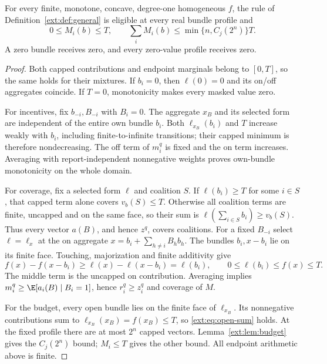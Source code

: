 \begin{theorem}\label{ext:thm:general}
For every finite, monotone, concave, degree-one homogeneous $f$, the rule of
Definition~\ref{ext:def:general} is eligible at every real bundle profile and
\[
 0\le M_i(b)\le T,\qquad
 \sum_iM_i(b)\le\min\{n,C_j(2^n)\}T.
\]
A zero bundle receives zero, and every zero-value profile receives zero.
\end{theorem}
\begin{proof}
Both capped contributions and endpoint marginals belong to $[0,T]$, so the
same holds for their mixtures.  If $b_i=0$, then $\ell(0)=0$ and its on/off
aggregates coincide.  If $T=0$, monotonicity makes every masked value zero.

For incentives, fix $b_{-i},B_{-i}$ with $B_i=0$.
The aggregate $x_B$ and its selected form are independent of the entire own
bundle $b_i$.  Both $\ell_{x_B}(b_i)$ and $T$ increase weakly with $b_i$,
including finite-to-infinite transitions; their capped minimum is therefore
nondecreasing.  The off term of $m_i^q$ is fixed and the on term increases.
Averaging with report-independent nonnegative weights proves own-bundle
monotonicity on the whole domain.

For coverage, fix a selected form $\ell$ and coalition $S$.
If $\ell(b_i)\ge T$ for some $i\in S$, that capped term alone covers
$v_b(S)\le T$.  Otherwise all coalition terms are finite, uncapped and on
the same face, so their sum is $\ell(\sum_{i\in S}b_i)\ge v_b(S)$.
Thus every vector $a(B)$, and hence $z^q$, covers coalitions.
For a fixed $B_{-i}$ select $\ell=\ell_x$ at the on aggregate
$x=b_i+\sum_{h\ne i}B_hb_h$.  The bundles $b_i,x-b_i$ lie on its finite face.
Touching, majorization and finite additivity give
\begin{equation}\label{ext:eq:endpoint}
 f(x)-f(x-b_i)\ge\ell(x)-\ell(x-b_i)=\ell(b_i),\qquad
 0\le\ell(b_i)\le f(x)\le T.
\end{equation}
The middle term is the uncapped on contribution.  Averaging implies
$m_i^q\ge\E[a_i(B)\mid B_i=1]$, hence $r_i^q\ge z_i^q$ and coverage of $M$.

For the budget, every open bundle lies on the finite face of $\ell_{x_B}$.
Its nonnegative contributions sum to $\ell_{x_B}(x_B)=f(x_B)\le T$,
so \eqref{ext:eq:open-sum} holds.  At the fixed profile there are at most
$2^n$ capped vectors.  Lemma~\ref{ext:lem:budget} gives the $C_j(2^n)$ bound;
$M_i\le T$ gives the other bound.  All endpoint arithmetic above is finite.
\end{proof}

